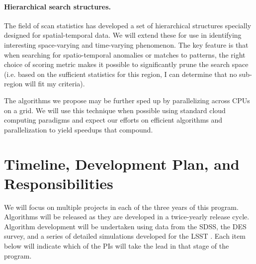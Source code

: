 \documentclass[prd,nofootbib,floatfix,11pt,tightenlines]{revtex4}
\begin{document}
\paragraph{Hierarchical search structures.}  
The field of scan statistics \cite{Kulldorf97,Neill03} has developed a set
of hierarchical structures specially designed for spatial-temporal data.
We will extend these for use in identifying interesting space-varying and
time-varying phenomenon.  The key feature is that when searching for
spatio-temporal anomalies or matches to patterns, the right choice of
scoring metric makes it possible to significantly prune the search space
(i.e. based on the sufficient statistics for this region, I can determine
that no sub-region will fit my criteria).

The algorithms we propose may be further sped up by parallelizing
across CPUs on a grid.  We will use this technique when possible using
standard cloud computing paradigms \cite{gard07} and expect our
efforts on efficient algorithms and parallelization to yield speedups
that compound.

\section{Timeline, Development Plan, and Responsibilities}

We will focus on multiple projects in each of the three years of this
program.  Algorithms will be released as they are developed in a
twice-yearly release cycle.  Algorithm development will be undertaken
using data from the SDSS, the DES survey, and  a series of detailed
simulations developed for the LSST \cite{connolly10}.  Each
item below will indicate which of the PIs will take the lead in that stage
of the program.

\end{document}
